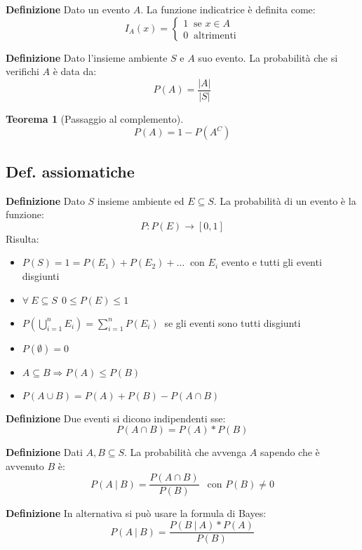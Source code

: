 \documentclass{article}
\newtheorem{theorem}{Teorema}
\begin{document}
\noindent\textbf{Definizione} Dato un evento $A$. La funzione indicatrice è definita come:
\[I_A(x)=\begin{cases}
    1\ \text{ se } x\in A\\
    0\ \text{ altrimenti}
\end{cases}\]\newline

\noindent\textbf{Definizione} Dato l'insieme ambiente $S$ e $A$ suo evento. La probabilità che si verifichi $A$ è data da:
$$P(A)=\frac{|A|}{|S|}$$\newline

\begin{theorem}[Passaggio al complemento]
    $$P(A)=1-P(A^C)$$\newline
\end{theorem}

\newpage

\subsection{Def. assiomatiche}

\textbf{Definizione} Dato $S$ insieme ambiente ed $E\subseteq S$. La probabilità di un evento è la funzione:
$$P:P(E)\rightarrow[0,1]$$
\noindent Risulta:
\begin{itemize}
    \item $P(S)=1=P(E_1)
    +P(E_2)+\ldots\ $ con $E_i$ evento e tutti gli eventi disgiunti
    \item $\forall\ E\subseteq S\ \ 0\leq P(E)\leq1$
    \item $P(\bigcup_{i=1}^nE_i)=\sum_{i=1}^nP(E_i)\ $ se gli eventi sono tutti disgiunti
    \item $P(\emptyset)=0$
    \item $A\subseteq B\Rightarrow P(A)\leq P(B)$
    \item $P(A\cup B)=P(A)+P(B)-P(A\cap B)$\newline
\end{itemize}

\noindent\textbf{Definizione} Due eventi si dicono indipendenti sse:
$$P(A\cap B)=P(A)*P(B)$$\newline

\noindent\textbf{Definizione} Dati $A,B\subseteq S$. La probabilità che avvenga $A$ sapendo che è avvenuto $B$ è:
$$P(A\ |\ B)=\frac{P(A\cap B)}{P(B)}\ \ \text{ con } P(B)\neq0$$\newline

\noindent\textbf{Definizione} In alternativa si può usare la formula di Bayes:
$$P(A\ |\ B)=\frac{P(B\ |\ A)*P(A)}{P(B)}$$\newline
\end{document}

